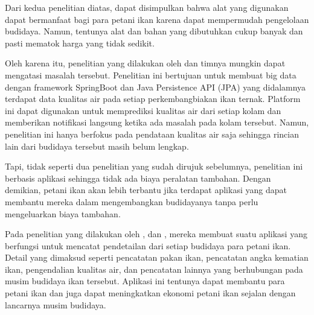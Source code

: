 Dari kedua penelitian diatas, dapat disimpulkan bahwa alat yang digunakan dapat bermanfaat bagi para petani ikan karena dapat mempermudah pengelolaan budidaya. Namun, tentunya alat dan bahan yang dibutuhkan cukup banyak dan pasti mematok harga yang tidak sedikit. 

Oleh karena itu, penelitian yang dilakukan oleh \citep*{waterquality} dan timnya mungkin dapat mengatasi masalah tersebut. Penelitian ini bertujuan untuk membuat big data dengan framework SpringBoot dan Java Persistence API (JPA) yang didalamnya terdapat data kualitas air pada setiap perkembangbiakan ikan ternak. Platform ini dapat digunakan untuk memprediksi kualitas air dari setiap kolam dan memberikan notifikasi langsung ketika ada masalah pada kolam tersebut. Namun, penelitian ini hanya berfokus pada pendataan kualitas air saja sehingga rincian lain dari budidaya tersebut masih belum lengkap. \citep*{waterquality} 

Tapi, tidak seperti dua penelitian yang sudah dirujuk sebelumnya, penelitian \citep*{waterquality} ini berbasis aplikasi sehingga tidak ada biaya peralatan tambahan. Dengan demikian, petani ikan akan lebih terbantu jika terdapat aplikasi yang dapat membantu mereka dalam mengembangkan budidayanya tanpa perlu mengeluarkan biaya tambahan.

Pada penelitian yang dilakukan oleh \citep*{fadhil2022}, \citep*{gian2022} dan \citep*{andri2022}, mereka membuat suatu aplikasi yang berfungsi untuk mencatat pendetailan dari setiap budidaya para petani ikan. Detail yang dimaksud seperti pencatatan pakan ikan, pencatatan angka kematian ikan, pengendalian kualitas air, dan pencatatan lainnya yang berhubungan pada musim budidaya ikan tersebut. Aplikasi ini tentunya dapat membantu para petani ikan dan juga dapat meningkatkan ekonomi petani ikan sejalan dengan lancarnya musim budidaya.

